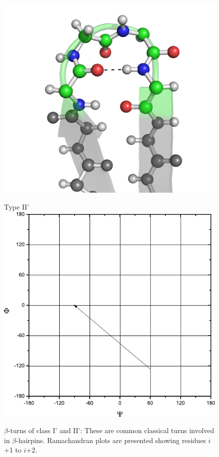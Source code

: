 \begin{figure}[p]
\begin{minipage}[b]{0.5\linewidth}
\centering
\includegraphics[width=1.0\textwidth]{./01-ProteinStructure/turns/beta-type-IIp.png}
\end{minipage}
\hspace{0.5cm}
\begin{minipage}[b]{0.3\linewidth}
\centering
Type II'
\includegraphics[width=1.0\textwidth]{./01-ProteinStructure/turns/beta-ram-type-IIp.pdf}
\end{minipage}

\caption[$\beta$-turns of class I' and II']{$\beta$-turns of class I' and II':
These are common classical turns involved in $\beta$-hairpins. Ramachandran plots are presented showing residues $i$+1 to $i$+2.}
\label{fig:intro:bturn2}

\end{figure}

